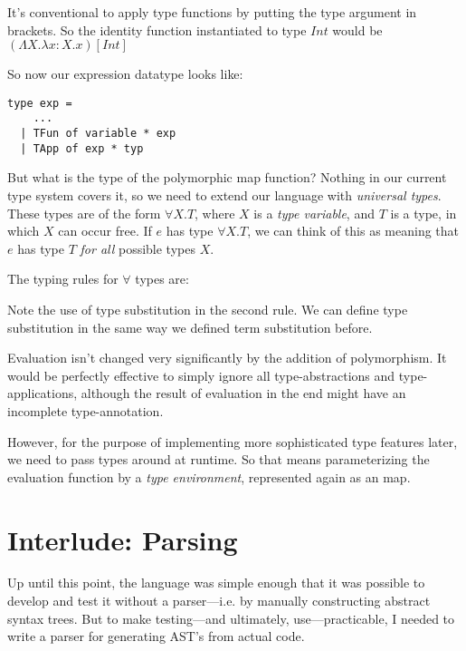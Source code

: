 \documentclass[pageno]{jpaper}
\begin{document}
{It's conventional to apply type functions by putting the type argument in brackets.  So the identity function
instantiated to type $Int$ would be $(\Lambda X.\lambda x:X.x) [Int]$

So now our expression datatype looks like:

\begin{lstlisting}
type exp =
    ...
  | TFun of variable * exp
  | TApp of exp * typ
\end{lstlisting}

But what is the type of the polymorphic map function? Nothing in our current type system covers it, so we need to
extend our language with \textit{universal types}. These types are of the form $\forall X. T$, where
$X$ is a \textit{type variable}, and $T$ is a type, in which $X$ can occur free.  If $e$
has type $\forall X.T$, we can think of this as meaning that $e$ has type $T$ \textit{for all} possible
types $X$.

The typing rules for $\forall$ types are:

\begin{prooftree}
\end{prooftree}

\begin{prooftree}
\end{prooftree}

Note the use of type substitution in the second rule. We can define type substitution in
the same way we defined term substitution before.

Evaluation isn't changed very significantly by the addition of polymorphism.
It would be perfectly effective to simply ignore all type-abstractions and type-applications,
although the result of evaluation in the end might have an incomplete type-annotation.

However, for the purpose of implementing more sophisticated type features later, we need to pass
types around at runtime. So that means parameterizing the evaluation function by a \textit{type environment},
represented again as an map.

\section{Interlude: Parsing}

Up until this point, the language was simple enough that it was possible to develop and test it  without a parser---i.e. by manually constructing abstract syntax trees. But to make testing---and ultimately, use---practicable, I needed to write a parser for generating AST's from actual code.

}
\end{document}
